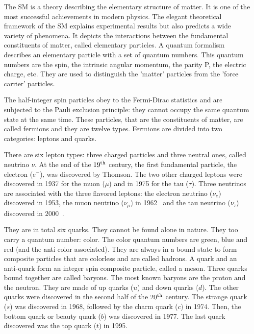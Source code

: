     The \acrfull{SM} is a theory describing the elementary structure of matter. 
    It is one of the most successful achievements in modern physics.
    The elegant theoretical framework of the \gls{SM} explains experimental results but also predicts a wide variety of phenomena.
    It depicts the interactions between the fundamental constituents of matter, called elementary particles.
    A quantum formalism describes an elementary particle with a set of quantum numbers.
    This quantum numbers are the spin, the intrinsic angular momentum, the parity P, the electric charge, etc.
    They are used to distinguish the 'matter' particles from the 'force carrier' particles.
    
    The half-integer spin particles obey to the Fermi-Dirac statistics and are subjected to the Pauli exclusion principle: they cannot occupy the same quantum state at the same time.
    These particles, that are the constituents of matter, are called fermions and they are twelve types.
    Fermions are divided into two categories: leptons and quarks. 
    
    There are six lepton types: three charged particles and three neutral ones, called neutrino $\nu$.
    At the end of the $19^{\rm{th}}$ century, the first fundamental particle, the electron ($e^{-}$), was discovered by Thomson.
    The two other charged leptons were discovered in 1937 for the muon ($\mu$) and in 1975 for the tau ($\tau$).
    Three neutrinos are associated with the three flavored leptons: the electron neutrino ($\nu_e$) discovered in 1953, the muon neutrino ($\nu_{\mu}$) in 1962~\cite{Erwin1961} and the tau neutrino ($\nu_{\tau}$) discovered in 2000~\cite{DONUT2000}.

    They are in total six quarks.
    They cannot be found alone in nature.
    They too carry a quantum number: color.
    The color quantum numbers are green, blue and red (and the anti-color associated).
    They are always in a bound state to form composite particles that are colorless and are called hadrons.
    A quark and an anti-quark form an integer spin composite particle, called a meson.
    Three quarks bound together are called baryons. 
    The most known baryons are the proton and the neutron.
    They are made of up quarks ($u$) and down quarks ($d$).
    The other quarks were discovered in the second half of the $20^{\rm{th}}$ century.
    The strange quark ($s$) was discovered in 1968, followed by the charm quark ($c$) in 1974.
    Then, the bottom quark or beauty quark ($b$) was discovered in 1977.
    The last quark discovered was the top quark ($t$) in 1995.  

